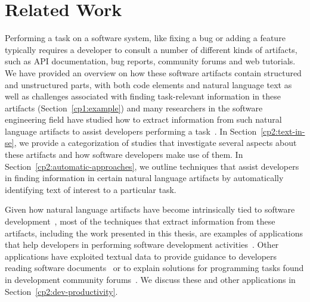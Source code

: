 \setcounter{chapter}{1}


\chapter{Related Work}
\label{ch:related-work}








Performing a task on a software system, like fixing a bug
or adding a feature typically requires a developer to consult
a number of different kinds of artifacts, such
as API documentation, bug reports, community forums
and web tutorials. 
We have provided an overview on how these software
artifacts contain structured and unstructured parts, 
with both code elements and natural language text
as well as challenges associated with finding task-relevant information 
in these artifacts (Section~\ref{cp1:example})
and many researchers in the 
software engineering field have studied
how to extract information from such natural language 
artifacts to assist developers performing a task~\cite{Holmes2008, Cubranic2005, Bavota2016}. 
In Section~\ref{cp2:text-in-se}, we provide 
a categorization of studies that investigate 
several aspects about these artifacts 
and how software developers make use of them.
In Section~\ref{cp2:automatic-approaches},
we outline techniques that
assist developers in finding information in 
certain natural language artifacts by 
automatically identifying text of interest 
to a particular task.












Given how 
natural language artifacts have become intrinsically
tied to software development~\cite{liu2021, watson2022, umarji2008archetypal},
most of the techniques that extract information from these artifacts, including the work presented in this thesis, 
are examples of applications that help developers in performing 
software development activities~\cite{Meyer2017}. 
Other applications have exploited textual data
to provide guidance to developers reading software documents~\cite{Treude2016,  robillard2017} 
or  to  explain solutions for programming tasks found in development community forums~\cite{silva2019}.
We discuss these and other applications in Section~\ref{cp2:dev-productivity}.








